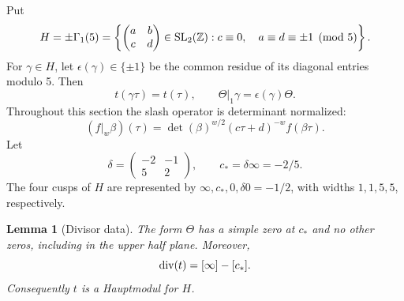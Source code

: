 \documentclass[11pt,a4paper]{article}
\newtheorem{lemma}[theorem]{Lemma}
\theoremstyle{definition}\newtheorem{definition}[theorem]{Definition}
\theoremstyle{remark}\newtheorem{remark}[theorem]{Remark}
\numberwithin{equation}{section}
\begin{document}
Put
\[
 H=\pm\Gamma_1(5)
   =\left\{\begin{pmatrix}a&b\\c&d\end{pmatrix}\in{\rm SL}_2(\mathbb Z):
        c\equiv0,\quad a\equiv d\equiv\pm1\pmod5\right\}.
\]
For \(\gamma\in H\), let \(\epsilon(\gamma)\in\{\pm1\}\) be the
common residue of its diagonal entries modulo 5.  Then
\[
 t(\gamma\tau)=t(\tau),\qquad
 \Theta|_1\gamma=\epsilon(\gamma)\Theta.
\]
Throughout this section the slash operator is determinant normalized:
\[
 (f|_w\beta)(\tau)=
 \det(\beta)^{w/2}(c\tau+d)^{-w}f(\beta\tau).
\]
Let
\[
 \delta=\begin{pmatrix}-2&-1\\5&2\end{pmatrix},
 \qquad c_*=\delta\infty=-2/5.
\]
The four cusps of \(H\) are represented by
\(\infty,c_*,0,\delta0=-1/2\), with widths \(1,1,5,5\), respectively.

\begin{lemma}[Divisor data]\label{E:lem:zagier-divisors}
The form \(\Theta\) has a simple zero at \(c_*\) and no other zeros,
including in the upper half plane.  Moreover,
\[
 {\rm div}(t)=[\infty]-[c_*].
\]
Consequently \(t\) is a Hauptmodul for \(H\).
\end{lemma}
\end{document}
